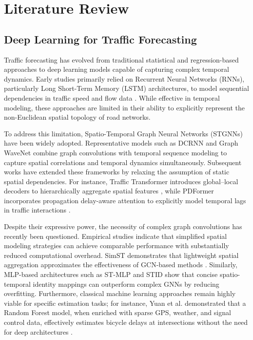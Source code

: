 \documentclass{article}
\begin{document}
\section{Literature Review}

\subsection{Deep Learning for Traffic Forecasting}
Traffic forecasting has evolved from traditional statistical and regression-based approaches to deep learning models capable of capturing complex temporal dynamics. Early studies primarily relied on Recurrent Neural Networks (RNNs), particularly Long Short-Term Memory (LSTM) architectures, to model sequential dependencies in traffic speed and flow data \cite{ma_long_2015, ma_forecasting_2021}. While effective in temporal modeling, these approaches are limited in their ability to explicitly represent the non-Euclidean spatial topology of road networks.

To address this limitation, Spatio-Temporal Graph Neural Networks (STGNNs) have been widely adopted. Representative models such as DCRNN \cite{li_diffusion_2017} and Graph WaveNet \cite{wu_graph_2019} combine graph convolutions with temporal sequence modeling to capture spatial correlations and temporal dynamics simultaneously. Subsequent works have extended these frameworks by relaxing the assumption of static spatial dependencies. For instance, Traffic Transformer introduces global–local decoders to hierarchically aggregate spatial features \cite{yan_learning_2022}, while PDFormer incorporates propagation delay-aware attention to explicitly model temporal lags in traffic interactions \cite{jiang_pdformer_2023}.

Despite their expressive power, the necessity of complex graph convolutions has recently been questioned. Empirical studies indicate that simplified spatial modeling strategies can achieve comparable performance with substantially reduced computational overhead. SimST demonstrates that lightweight spatial aggregation approximates the effectiveness of GCN-based methods \cite{liu_we_2023}. Similarly, MLP-based architectures such as ST-MLP \cite{wang_st-mlp_2023} and STID \cite{shao_spatial-temporal_2022} show that concise spatio-temporal identity mappings can outperform complex GNNs by reducing overfitting. Furthermore, classical machine learning approaches remain highly viable for specific estimation tasks; for instance, Yuan et al. demonstrated that a Random Forest model, when enriched with sparse GPS, weather, and signal control data, effectively estimates bicycle delays at intersections without the need for deep architectures \cite{yuan_machine_2025}.
\end{document}
